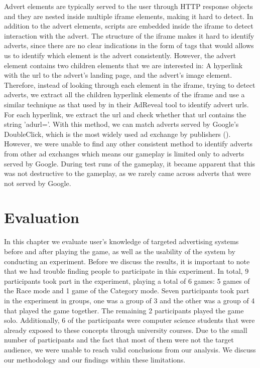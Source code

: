 \documentclass{l4proj}
\begin{document}
Advert elements are typically served to the user through HTTP response objects and they are nested inside multiple iframe elements, making it hard to detect. In addition to the advert elements, scripts are embedded inside the iframe to detect interaction with the advert. The structure of the iframe makes it hard to identify adverts, since there are no clear indications in the form of tags that would allows us to identify which element is the advert consistently. However, the advert element contains two children elements that we are interested in: A hyperlink with the url to the advert's landing page, and the advert's image element. Therefore, instead of looking through each element in the iframe, trying to detect adverts, we extract all the children hyperlink elements of the iframe and use a similar technique as that used by \cite{Liu2013} in their AdReveal tool to identify advert urls. For each hyperlink, we extract the url and check whether that url contains the string 'adurl='. With this method, we can match adverts served by Google's DoubleClick, which is the most widely used ad exchange by publishers (\cite{dclick}). However, we were unable to find any other consistent method to identify adverts from other ad exchanges which means our gameplay is limited only to adverts served by Google. During test runs of the gameplay, it became apparent that this was not destructive to the gameplay, as we rarely came across adverts that were not served by Google.

\chapter{Evaluation} 
In this chapter we evaluate user's knowledge of targeted advertising systems before and after playing the game, as well as the usability of the system by conducting an experiment. 
Before we discuss the results, it is important to note that we had trouble finding people to participate in this experiment. In total, 9 participants took part in the experiment, playing a total of 6 games: 5 games of the Race mode and 1 game of the Category mode. Seven participants took part in the experiment in groups, one was a group of 3 and the other was a group of 4 that played the game together. The remaining 2 participants played the game solo. Additionally, 6 of the participants were computer science students that were already exposed to these concepts through university courses. Due to the small number of participants and the fact that most of them were not the target audience, we were unable to reach valid conclusions from our analysis. We discuss our methodology and our findings within these limitations.
\end{document}
